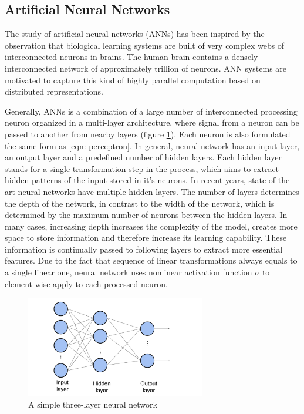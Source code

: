 \subsection{Artificial Neural Networks}

The study of artificial neural networks (ANNs) has been inspired by the observation that biological learning systems are built of very complex webs of interconnected neurons in brains. The human brain contains a densely interconnected network of approximately trillion of neurons. ANN systems are motivated to capture this kind of highly parallel computation based on distributed representations. 

Generally, ANNs is a combination of a large number of interconnected processing neuron organized in a multi-layer architecture, where signal from a neuron can be passed to another from nearby layers (figure \ref{fig:neural_nets}). Each neuron is also formulated the same form as \ref{eqn: perceptron}. In general, neural network has an input layer, an output layer and a predefined number of hidden layers. Each hidden layer stands for a single transformation step in the process, which aims to extract hidden patterns of the input stored in it's neurons.  In recent years, state-of-the-art neural networks have multiple hidden layers. The number of layers determines the depth of the network, in contrast to the width of the network, which is determined by the maximum number of neurons between the hidden layers. In many cases, increasing depth increases the complexity of
the model, creates more space to store information and therefore increase its learning capability. These information is continually passed to following layers to extract more essential features. Due to the fact that sequence of linear transformations always equals to a single linear one, neural network uses nonlinear activation function $\sigma$ to element-wise apply to each processed neuron. 

\begin{figure}[h]
    \centering
    \includegraphics[width=0.7\textwidth]{content/resources/new_images/related_works/neural_nets.pdf}
    \caption{A simple three-layer neural network}
    \label{fig:neural_nets}
\end{figure}


